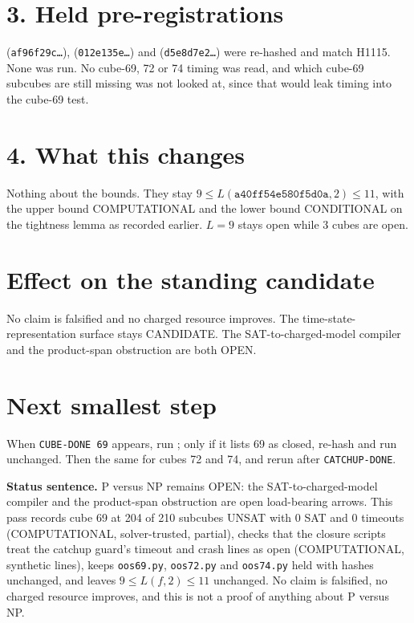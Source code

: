 \documentclass[11pt]{article}
\begin{document}
\section*{3. Held pre-registrations}
 (\texttt{af96f29c\ldots}),  (\texttt{012e135e\ldots}) and  (\texttt{d5e8d7e2\ldots}) were re-hashed and match H1115. None was run. No cube-69, 72 or 74 timing was read, and which cube-69 subcubes are still missing was not looked at, since that would leak timing into the cube-69 test.

\section*{4. What this changes}
Nothing about the bounds. They stay $9\le L(\texttt{a40ff54e580f5d0a},2)\le 11$, with the upper bound COMPUTATIONAL and the lower bound CONDITIONAL on the tightness lemma as recorded earlier. $L=9$ stays open while 3 cubes are open.

\section*{Effect on the standing candidate}
No claim is falsified and no charged resource improves. The time-state-representation surface stays CANDIDATE. The SAT-to-charged-model compiler and the product-span obstruction are both OPEN.

\section*{Next smallest step}
When \texttt{CUBE-DONE 69} appears, run ; only if it lists 69 as closed, re-hash and run  unchanged. Then the same for cubes 72 and 74, and rerun  after \texttt{CATCHUP-DONE}.

\bigskip
\noindent\textbf{Status sentence.} P versus NP remains OPEN: the SAT-to-charged-model compiler and the product-span obstruction are open load-bearing arrows. This pass records cube 69 at 204 of 210 subcubes UNSAT with 0 SAT and 0 timeouts (COMPUTATIONAL, solver-trusted, partial), checks that the closure scripts treat the catchup guard's timeout and crash lines as open (COMPUTATIONAL, synthetic lines), keeps \texttt{oos69.py}, \texttt{oos72.py} and \texttt{oos74.py} held with hashes unchanged, and leaves $9\le L(f,2)\le 11$ unchanged. No claim is falsified, no charged resource improves, and this is not a proof of anything about P versus NP.
\end{document}
